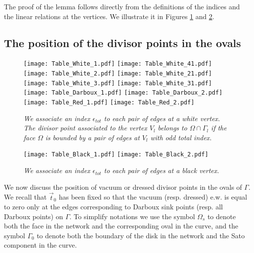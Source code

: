 \documentclass[11pt]{amsart}
\theoremstyle{plain}
\numberwithin{equation}{section}
\begin{document}
The proof of the lemma follows directly from the definitions of the indices and the linear relations at the vertices. We illustrate it in Figures \ref{fig:table_divisor1} and \ref{fig:table_divisor2}.

\subsection{The position of the divisor points in the ovals}\label{sec:position}
\begin{figure}%
	 \texttt{[image: Table\_White\_1.pdf]}
	\hspace{.5 truecm}
	 \texttt{[image: Table\_White\_41.pdf]}
	\texttt{[image: Table\_White\_2.pdf]}
	\hspace{.5 truecm}
	 \texttt{[image: Table\_White\_21.pdf]}
	\texttt{[image: Table\_White\_3.pdf]}
	\hspace{.5 truecm}
	 \texttt{[image: Table\_White\_31.pdf]}
\texttt{[image: Table\_Darboux\_1.pdf]}
	\hspace{.5 truecm}
	 \texttt{[image: Table\_Darboux\_2.pdf]}
	\texttt{[image: Table\_Red\_1.pdf]}
	\hspace{.5 truecm}
	 \texttt{[image: Table\_Red\_2.pdf]}
  \caption{\small{\sl We associate an index $\epsilon_{tot}$ to each pair of edges at a white vertex. The divisor point associated to the vertex $V_l$ belongs to $\Omega\cap \Gamma_l$ if the face $\Omega$ is bounded by a pair of edges at $V_l$ with odd total index.}}
	\label{fig:table_divisor1}
\end{figure}

\begin{figure}%
  \centering
  \texttt{[image: Table\_Black\_1.pdf]}
	\hspace{.5 truecm}
	 \texttt{[image: Table\_Black\_2.pdf]}
  \vspace{-.7 truecm}
  \caption{\small{\sl We associate an index $\epsilon_{tot}$ to each pair of edges at a black vertex.}}
	\label{fig:table_divisor2}
\end{figure}
We now discuss the position of vacuum or dressed divisor points in the ovals of $\Gamma$. We recall that $\vec t_0$ has been fixed so that the vacuum (resp. dressed) e.w. is equal to zero only at the edges corresponding to Darboux sink points (resp. all Darboux points) on $\Gamma$. To simplify notations we use the symbol $\Omega_s$ to denote both the face in the network and the corresponding oval in the curve, and the symbol $\Gamma_0$ to denote both the boundary of the disk in the network and the Sato component in the curve.
\end{document}
